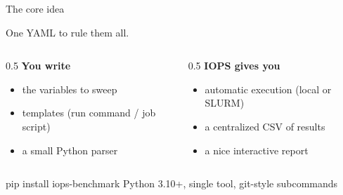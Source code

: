 \documentclass[aspectratio=169,11pt]{beamer}
\newcommand{\code}[1]{{\ttfamily\small\color{iopsNavy}#1}}
\begin{document}
\begin{frame}{The core idea}
  \begin{keybox}[colback=iopsSky, colframe=iopsBlue]
    \centering\large One YAML to rule them all.
  \end{keybox}
  \vspace{0.6em}
  \begin{columns}[T]
    \begin{column}{0.5\textwidth}
      \textbf{You write}
      \begin{itemize}
        \item the variables to sweep
        \item templates (run command / job script)
        \item a small Python parser
      \end{itemize}
    \end{column}
    \begin{column}{0.5\textwidth}
      \textbf{IOPS gives you}
      \begin{itemize}
        \item automatic execution (local or SLURM)
        \item a centralized CSV of results
        \item a nice interactive report
      \end{itemize}
    \end{column}
  \end{columns}
  \vspace{0.5em}
  \begin{center}
    \code{pip install iops-benchmark}\hfill
    {\footnotesize\color{iopsGrey}Python 3.10+, single tool, git-style subcommands}
  \end{center}
\end{frame}
\end{document}
